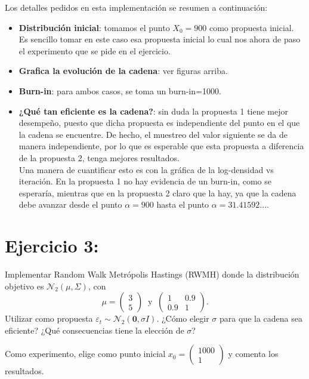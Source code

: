 \documentclass[letterpaper]{article}
\newcommand{\1}{\mathds{1}}
\theoremstyle{definition}
\theoremstyle{definition}
\theoremstyle{definition}
\theoremstyle{definition}
\theoremstyle{definition}
\begin{document}
    Los detalles pedidos en esta implementación se resumen a continuación:
    \begin{itemize}
        \item \textbf{Distribución inicial}: tomamos el punto $X_0=900$ como propuesta inicial. Es sencillo tomar en este caso esa propuesta inicial
        lo cual nos ahora de paso el experimento que se pide en el ejercicio.
        \item \textbf{Grafica la evolución de la cadena}: ver figuras arriba.
        \item \textbf{Burn-in}: para ambos casos, se toma un burn-in=1000.
        \item \textbf{¿Qué tan eficiente es la cadena?}: sin duda la propuesta 1 tiene mejor desempeño, puesto que dicha propuesta 
        es independiente del punto en el que la cadena se encuentre. De hecho, el muestreo del valor siguiente se da de manera independiente, 
        por lo que es esperable que esta propuesta a diferencia de la propuesta 2, tenga mejores resultados.
        \\

        Una manera de cuantificar esto es con la gráfica de la log-densidad vs iteración. En la propuesta 1 no hay 
        evidencia de un burn-in, como se esperaría, mientras que en la propuesta 2 claro que la hay, ya que 
        la cadena debe avanzar desde el punto $\alpha=900$ hasta el punto $\alpha=31.41592...$.
    \end{itemize}
    \newpage

\section*{Ejercicio 3:}
Implementar Random Walk Metrópolis Hastings (RWMH) donde la distribución
    objetivo es $\mathcal{N}_2(\mu,\Sigma)$, con 
    \[
    \mu=\begin{pmatrix}
        3\\
        5
    \end{pmatrix} \ \text{ y } \ 
    \begin{pmatrix}
        1 & 0.9\\
        0.9 & 1
    \end{pmatrix}.    
    \]
    Utilizar como propuesta $\varepsilon_t\sim \mathcal{N}_2(\textbf{0},\sigma I)$. ¿Cómo elegir 
    $\sigma$ para que la cadena sea eficiente? ¿Qué consecuencias tiene la elección de $\sigma$?

    Como experimento, elige como punto inicial $x_0= \begin{pmatrix}
        1000\\
        1
    \end{pmatrix}$ y comenta los resultados.\\
\end{document}
